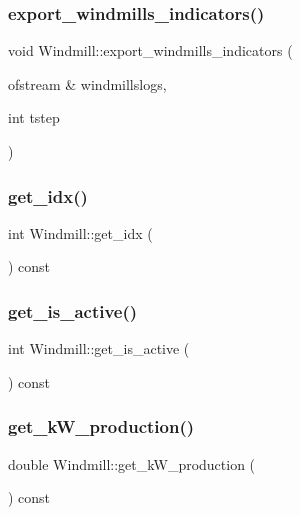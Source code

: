 \subsubsection{\texorpdfstring{export\_windmills\_indicators()}{export\_windmills\_indicators()}}
{\footnotesize\ttfamily void Windmill\+::export\+\_\+windmills\+\_\+indicators (\begin{DoxyParamCaption}\item[{ofstream \&}]{windmillslogs,  }\item[{int}]{tstep }\end{DoxyParamCaption})}

\mbox{\label{class_windmill_a609521495ddc227888b3cab504ea9fba}} 
\subsubsection{\texorpdfstring{get\_idx()}{get\_idx()}}
{\footnotesize\ttfamily int Windmill\+::get\+\_\+idx (\begin{DoxyParamCaption}{ }\end{DoxyParamCaption}) const}

\mbox{\label{class_windmill_a31c7e5766ef3621c9fbfa949104278b9}} 
\subsubsection{\texorpdfstring{get\_is\_active()}{get\_is\_active()}}
{\footnotesize\ttfamily int Windmill\+::get\+\_\+is\+\_\+active (\begin{DoxyParamCaption}{ }\end{DoxyParamCaption}) const}

\mbox{\label{class_windmill_aa86a674862be49762f19203f646b6760}} 
\subsubsection{\texorpdfstring{get\_kW\_production()}{get\_kW\_production()}}
{\footnotesize\ttfamily double Windmill\+::get\+\_\+k\+W\+\_\+production (\begin{DoxyParamCaption}{ }\end{DoxyParamCaption}) const}

